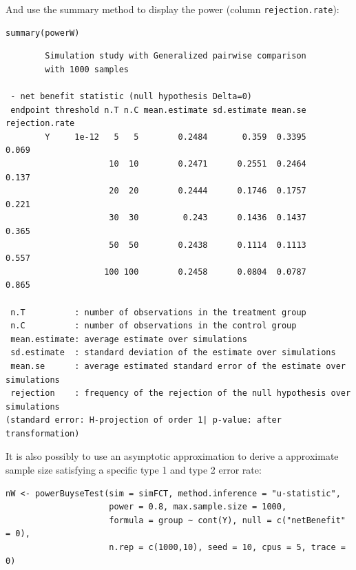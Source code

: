 \documentclass[12pt]{article}
\begin{document}
\clearpage

And use the summary method to display the power (column
\texttt{rejection.rate}):
\lstset{language=r,label= ,caption= ,captionpos=b,numbers=none}
\begin{lstlisting}
summary(powerW)
\end{lstlisting}

\begin{verbatim}
        Simulation study with Generalized pairwise comparison
        with 1000 samples

 - net benefit statistic (null hypothesis Delta=0)
 endpoint threshold n.T n.C mean.estimate sd.estimate mean.se rejection.rate
        Y     1e-12   5   5        0.2484       0.359  0.3395          0.069
                     10  10        0.2471      0.2551  0.2464          0.137
                     20  20        0.2444      0.1746  0.1757          0.221
                     30  30         0.243      0.1436  0.1437          0.365
                     50  50        0.2438      0.1114  0.1113          0.557
                    100 100        0.2458      0.0804  0.0787          0.865

 n.T          : number of observations in the treatment group
 n.C          : number of observations in the control group
 mean.estimate: average estimate over simulations
 sd.estimate  : standard deviation of the estimate over simulations
 mean.se      : average estimated standard error of the estimate over simulations
 rejection    : frequency of the rejection of the null hypothesis over simulations
(standard error: H-projection of order 1| p-value: after transformation)
\end{verbatim}

It is also possibly to use an asymptotic approximation to derive a
approximate sample size satisfying a specific type 1 and type 2 error
rate:
\lstset{language=r,label= ,caption= ,captionpos=b,numbers=none}
\begin{lstlisting}
nW <- powerBuyseTest(sim = simFCT, method.inference = "u-statistic", 
                     power = 0.8, max.sample.size = 1000,                     
                     formula = group ~ cont(Y), null = c("netBenefit" = 0),
                     n.rep = c(1000,10), seed = 10, cpus = 5, trace = 0)
\end{lstlisting}
\end{document}
